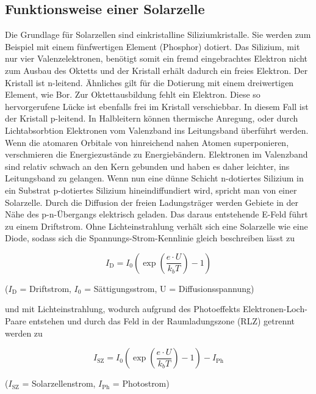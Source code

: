 \subsection{Funktionsweise einer Solarzelle}
Die Grundlage für Solarzellen sind einkristalline Siliziumkristalle. Sie werden zum Beispiel mit einem fünfwertigen Element (Phosphor)
dotiert. Das Silizium, mit nur vier Valenzelektronen, benötigt somit ein fremd eingebrachtes Elektron nicht zum Ausbau des Oktetts und der
Kristall erhält dadurch ein freies Elektron. Der Kristall ist n-leitend. Ähnliches gilt für die Dotierung mit einem dreiwertigen Element,
wie Bor. Zur Oktettausbildung fehlt ein Elektron. Diese so hervorgerufene Lücke ist ebenfalls frei im Kristall verschiebbar. In diesem Fall
ist der Kristall p-leitend. In Halbleitern können thermische Anregung, oder durch Lichtabsorbtion Elektronen vom Valenzband ins 
Leitungsband überführt werden. Wenn die atomaren Orbitale von hinreichend nahen Atomen superponieren, verschmieren die Energiezustände
zu Energiebändern. Elektronen im Valenzband sind relativ schwach an den Kern gebunden und haben es daher leichter, ins Leitungsband
zu gelangen. Wenn nun eine dünne Schicht n-dotiertes Silizium in ein Substrat p-dotiertes Silizium hineindiffundiert wird,
spricht man von einer Solarzelle. Durch die Diffusion der freien Ladungsträger werden Gebiete in der Nähe des p-n-Übergangs elektrisch geladen.
Das daraus entstehende E-Feld führt zu einem Driftstrom. Ohne Lichteinstrahlung verhält sich eine Solarzelle wie eine Diode, sodass
sich die Spannungs-Strom-Kennlinie gleich beschreiben lässt zu

\begin{formel}
\begin{equation}
 I_{\text{D}} = I_0 \left(\exp\left(\frac{e \cdot U}{k_b T}\right)-1\right)
\end{equation}
 \caption*{\small{($I_\text{D}$ = Driftstrom, $I_0$ = Sättigungsstrom, U = Diffusionsspannung)}}
\end{formel}

und mit Lichteinstrahlung, wodurch aufgrund des Photoeffekts Elektronen-Loch-Paare entstehen und durch das Feld in der 
Raumladungszone (RLZ) getrennt werden zu

\begin{formel}
\begin{equation}
 I_{\text{SZ}} = I_0 \left(\exp\left(\frac{e \cdot U}{k_b T}\right)-1\right) - I_{\text{Ph}}
\end{equation}
 \caption*{\small{($I_{\text{SZ}}$ = Solarzellenstrom, $I_{\text{Ph}}$ = Photostrom)}}
\end{formel}

